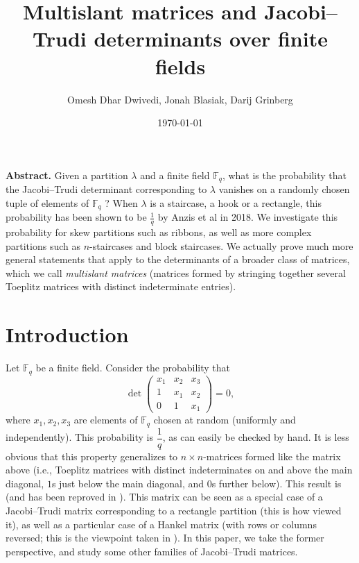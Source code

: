 \documentclass[numbers=enddot,12pt,final,onecolumn,notitlepage]{scrartcl}%
\theoremstyle{definition}
\newcommand{\Fq}{\mathbb{F}_q}
\theoremstyle{plainsl}
\begin{document}
\title{Multislant matrices and Jacobi--Trudi determinants over finite fields}
\author{Omesh Dhar Dwivedi, Jonah Blasiak, Darij Grinberg}
\date{
\today
}
\maketitle

\textbf{Abstract.}
Given a partition $\lambda$ and a finite field $\mathbb{F}_q$, what is the probability that the Jacobi--Trudi determinant corresponding to $\lambda$ vanishes on a randomly chosen tuple of elements of $\Fq$ ? When $\lambda$ is a staircase, a hook or a rectangle, this probability has been shown to be $\frac{1}{q}$ by Anzis et al in 2018. We investigate this probability for skew partitions such as ribbons, as well as more complex partitions such as $n$-staircases and block staircases. We actually prove much more general statements that apply to the determinants of a broader class of matrices, which we call \emph{multislant matrices} (matrices formed by stringing together several Toeplitz matrices with distinct indeterminate entries).

\section{\label{sec.introduction}Introduction}

Let $\mathbb{F}_q$ be a finite field. Consider the probability that  
\[
\det \begin{pmatrix}
x_{1} & x_{2} & x_{3}\\
1 & x_{1} & x_{2}\\
0 & 1 & x_{1}
\end{pmatrix} =0 ,
\]
where $x_{1},x_{2},x_{3}$ are elements of $\mathbb{F}_{q}$ chosen
at random (uniformly and independently).
This probability is $\dfrac{1}{q}$, as can easily be checked by hand.
It is less obvious that this property generalizes to $n\times n$-matrices formed like the matrix above (i.e., Toeplitz matrices with distinct indeterminates on and above the main diagonal, $1$s just below the main diagonal, and $0$s further below).
This result is \cite[Corollary 6.4]{Anzis18} (and has been reproved in \cite[Corollary 5.1]{dwivedi2021rank}).
This matrix can be seen as a special case of a Jacobi--Trudi matrix corresponding to a rectangle partition (this is how \cite{Anzis18} viewed it), as well as a particular case of a Hankel matrix (with rows or columns reversed; this is the viewpoint taken in \cite{dwivedi2021rank}).
In this paper, we take the former perspective, and study some other families of Jacobi--Trudi matrices.
\end{document}
